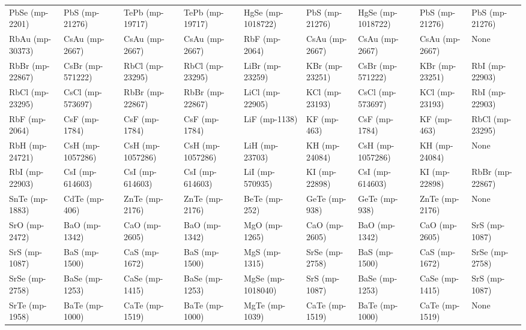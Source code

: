 \begin{longtable}{lllllllll}
   PbSe (mp-2201) &    PbS (mp-21276) &     TePb (mp-19717) &   TePb (mp-19717) &   HgSe (mp-1018722) &    PbS (mp-21276) & HgSe (mp-1018722) &    PbS (mp-21276) &    PbS (mp-21276) \\
  RbAu (mp-30373) &    CsAu (mp-2667) &      CsAu (mp-2667) &    CsAu (mp-2667) &       RbF (mp-2064) &    CsAu (mp-2667) &    CsAu (mp-2667) &    CsAu (mp-2667) &              None \\
  RbBr (mp-22867) &  CsBr (mp-571222) &     RbCl (mp-23295) &   RbCl (mp-23295) &     LiBr (mp-23259) &    KBr (mp-23251) &  CsBr (mp-571222) &    KBr (mp-23251) &    RbI (mp-22903) \\
  RbCl (mp-23295) &  CsCl (mp-573697) &     RbBr (mp-22867) &   RbBr (mp-22867) &     LiCl (mp-22905) &    KCl (mp-23193) &  CsCl (mp-573697) &    KCl (mp-23193) &    RbI (mp-22903) \\
    RbF (mp-2064) &     CsF (mp-1784) &       CsF (mp-1784) &     CsF (mp-1784) &       LiF (mp-1138) &       KF (mp-463) &     CsF (mp-1784) &       KF (mp-463) &   RbCl (mp-23295) \\
   RbH (mp-24721) &  CsH (mp-1057286) &    CsH (mp-1057286) &  CsH (mp-1057286) &      LiH (mp-23703) &     KH (mp-24084) &  CsH (mp-1057286) &     KH (mp-24084) &              None \\
   RbI (mp-22903) &   CsI (mp-614603) &     CsI (mp-614603) &   CsI (mp-614603) &     LiI (mp-570935) &     KI (mp-22898) &   CsI (mp-614603) &     KI (mp-22898) &   RbBr (mp-22867) \\
   SnTe (mp-1883) &     CdTe (mp-406) &      ZnTe (mp-2176) &    ZnTe (mp-2176) &       BeTe (mp-252) &     GeTe (mp-938) &     GeTe (mp-938) &    ZnTe (mp-2176) &              None \\
    SrO (mp-2472) &     BaO (mp-1342) &       CaO (mp-2605) &     BaO (mp-1342) &       MgO (mp-1265) &     CaO (mp-2605) &     BaO (mp-1342) &     CaO (mp-2605) &     SrS (mp-1087) \\
    SrS (mp-1087) &     BaS (mp-1500) &       CaS (mp-1672) &     BaS (mp-1500) &       MgS (mp-1315) &    SrSe (mp-2758) &     BaS (mp-1500) &     CaS (mp-1672) &    SrSe (mp-2758) \\
   SrSe (mp-2758) &    BaSe (mp-1253) &      CaSe (mp-1415) &    BaSe (mp-1253) &   MgSe (mp-1018040) &     SrS (mp-1087) &    BaSe (mp-1253) &    CaSe (mp-1415) &     SrS (mp-1087) \\
   SrTe (mp-1958) &    BaTe (mp-1000) &      CaTe (mp-1519) &    BaTe (mp-1000) &      MgTe (mp-1039) &    CaTe (mp-1519) &    BaTe (mp-1000) &    CaTe (mp-1519) &              None \\

\end{longtable}
